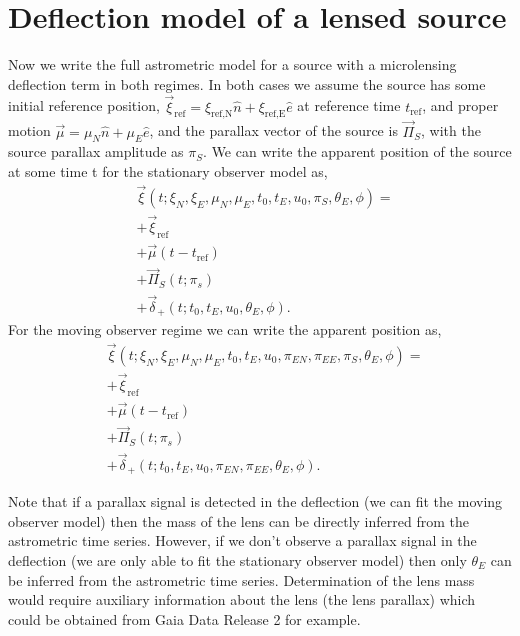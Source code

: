 \documentclass[11pt]{article}
\begin{document}
\section{Deflection model of a lensed source}

Now we write the full astrometric model for a source with a microlensing deflection term in both regimes.
In both cases we assume the source has some initial reference position, 
$\vec{\xi}_{\text{ref}}=\xi_{\text{ref,N}}\hat{n}+\xi_{\text{ref,E}}\hat{e}$ at reference time $t_{\text{ref}}$, 
and proper motion $\vec{\mu}=\mu_{N}\hat{n}+\mu_{E}\hat{e}$, and the parallax vector of the source is $\vec{\Pi}_{S}$, with the
source parallax amplitude as $\pi_{S}$. We can write the apparent position of the 
source at some time t for the stationary observer model as,
%
\begin{equation}
\begin{aligned}
&\vec{\xi}(t;\xi_{N},\xi_{E},\mu_{N},\mu_{E},t_{0},t_{E},u_{0},\pi_{S},\theta_{E},\phi) = \\
&+\vec{\xi}_{\text{ref}} \\
&+\vec{\mu}(t-t_{\text{ref}}) \\
&+\vec{\Pi}_{S}(t;\pi_{s})\\
&+\vec{\delta}_{+}(t;t_{0},t_{E},u_{0},\theta_{E},\phi).
\end{aligned}
\end{equation}
%
For the moving observer regime we can write the apparent position as, 
\begin{equation}
\begin{aligned}
&\vec{\xi}(t;\xi_{N},\xi_{E},\mu_{N},\mu_{E},t_{0},t_{E},u_{0},\pi_{EN},\pi_{EE},\pi_{S},\theta_{E},\phi) = \\
&+\vec{\xi}_{\text{ref}} \\
&+\vec{\mu}(t-t_{\text{ref}}) \\
&+\vec{\Pi}_{S}(t;\pi_{s})\\
&+\vec{\delta}_{+}(t;t_{0},t_{E},u_{0},\pi_{EN},\pi_{EE},\theta_{E},\phi).
\end{aligned}
\end{equation}

Note that if a parallax signal is detected in the deflection (we can fit the moving observer model)
then the mass of the lens can be directly inferred from the astrometric time series. However, if we don't observe
a parallax signal in the deflection (we are only able to fit the stationary observer model) then only $\theta_{E}$
can be inferred from the astrometric time series. Determination of the lens mass would require auxiliary information
about the lens (the lens parallax) which could be obtained from Gaia Data Release 2 for example.

 

\end{document}

